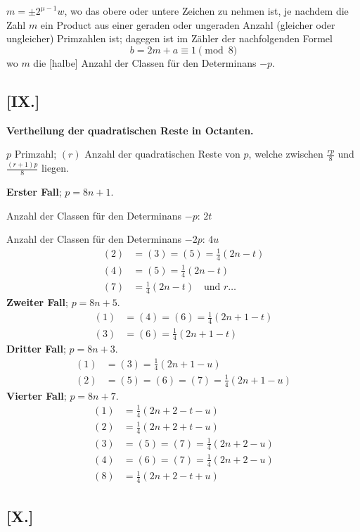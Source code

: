 \documentclass[12pt,a4paper]{article}
\begin{document}
$m = \pm 2^{\mu-1} w$, wo das obere oder untere Zeichen zu nehmen ist, je nachdem die Zahl $m$ ein Product aus einer geraden oder ungeraden Anzahl (gleicher oder ungleicher) Primzahlen ist; dagegen ist im Z\"ahler der nachfolgenden Formel
\[
b = 2m + a \equiv 1 \pmod{8}
\]
wo $m$ die [halbe] Anzahl der Classen f\"ur den Determinans $-p$.

\subsection*{[IX.]}

\textbf{Vertheilung der quadratischen Reste in Octanten.}

$p$ Primzahl; $(r)$ Anzahl der quadratischen Reste von $p$, welche zwischen $\frac{rp}{8}$ und $\frac{(r+1)p}{8}$ liegen.

\textbf{Erster Fall}; $p = 8n+1$.

Anzahl der Classen f\"ur den Determinans $-p$: $2t$

Anzahl der Classen f\"ur den Determinans $-2p$: $4u$
\begin{align*}
(2) &= (3) = (5) = \tfrac{1}{4}(2n-t)\\
(4) &= (5) = \tfrac{1}{4}(2n-t)\\
(7) &= \tfrac{1}{4}(2n-t) \quad\text{und } r\ldots
\end{align*}
\textbf{Zweiter Fall}; $p = 8n+5$.
\begin{align*}
(1) &= (4) = (6) = \tfrac{1}{4}(2n+1-t)\\
(3) &= (6) = \tfrac{1}{4}(2n+1-t)
\end{align*}
\textbf{Dritter Fall}; $p = 8n+3$.
\begin{align*}
(1) &= (3) = \tfrac{1}{4}(2n+1-u)\\
(2) &= (5) = (6) = (7) = \tfrac{1}{4}(2n+1-u)
\end{align*}
\textbf{Vierter Fall}; $p = 8n+7$.
\begin{align*}
(1) &= \tfrac{1}{4}(2n+2-t-u)\\
(2) &= \tfrac{1}{4}(2n+2+t-u)\\
(3) &= (5) = (7) = \tfrac{1}{4}(2n+2-u)\\
(4) &= (6) = (7) = \tfrac{1}{4}(2n+2-u)\\
(8) &= \tfrac{1}{4}(2n+2-t+u)
\end{align*}

\subsection*{[X.]}
\end{document}
